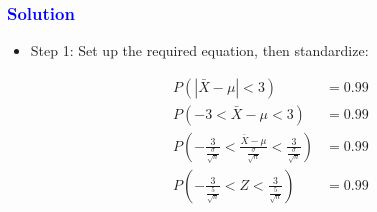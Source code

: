 \documentclass[12pt]{beamer}
\begin{document}
\begin{frame}
	\frametitle{\textcolor{blue}{Solution}}
	
	\begin{itemize}[label={\color{blue}$\blacktriangleright$}]
		\item Step 1: Set up the required equation, then standardize:
		
		
		\begin{align*}
			P(|\bar{X} - \mu| < 3) &= 0.99 \\
			P(-3 < \bar{X} - \mu < 3) &= 0.99 \\
			P\left(-\frac{3}{\frac{\sigma}{\sqrt{n}}} < \frac{\bar{X} - \mu}{\frac{\sigma}{\sqrt{n}}} < \frac{3}{\frac{\sigma}{\sqrt{n}}}\right) &= 0.99 \\
			P\left(-\frac{3}{\frac{5}{\sqrt{n}}} < Z < \frac{3}{\frac{5}{\sqrt{n}}}\right) &= 0.99
		\end{align*}
	\end{itemize}
	
\end{frame}
\end{document}
